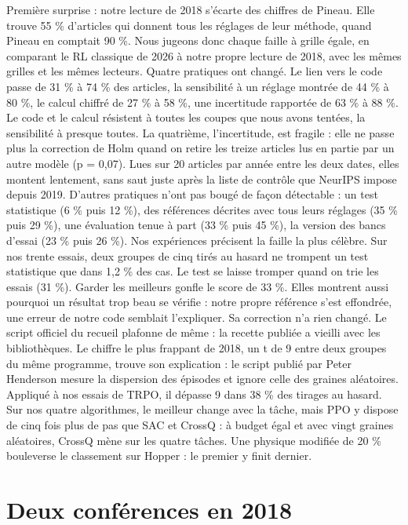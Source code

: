 \documentclass[11pt,a4paper]{article}
\begin{document}
Première surprise : notre lecture de 2018 s'écarte des chiffres de
Pineau. Elle trouve 55 \% d'articles qui donnent tous les réglages de
leur méthode, quand Pineau en comptait 90 \%. Nous jugeons donc chaque
faille à grille égale, en comparant le RL classique de 2026 à notre
propre lecture de 2018, avec les mêmes grilles et les mêmes lecteurs.
Quatre pratiques ont changé. Le lien vers le code passe de 31 \% à 74 \%
des articles, la sensibilité à un réglage montrée de 44 \% à 80 \%, le
calcul chiffré de 27 \% à 58 \%, une incertitude rapportée de 63 \% à 88
\%. Le code et le calcul résistent à toutes les coupes que nous avons
tentées, la sensibilité à presque toutes. La quatrième, l'incertitude,
est fragile : elle ne passe plus la correction de Holm quand on retire
les treize articles lus en partie par un autre modèle (p = 0,07). Lues
sur 20 articles par année entre les deux dates, elles montent lentement,
sans saut juste après la liste de contrôle que NeurIPS impose depuis
2019. D'autres pratiques n'ont pas bougé de façon détectable : un test
statistique (6 \% puis 12 \%), des références décrites avec tous leurs
réglages (35 \% puis 29 \%), une évaluation tenue à part (33 \% puis 45
\%), la version des bancs d'essai (23 \% puis 26 \%). Nos expériences
précisent la faille la plus célèbre. Sur nos trente essais, deux groupes
de cinq tirés au hasard ne trompent un test statistique que dans 1,2 \%
des cas. Le test se laisse tromper quand on trie les essais (31 \%).
Garder les meilleurs gonfle le score de 33 \%. Elles montrent aussi
pourquoi un résultat trop beau se vérifie : notre propre référence s'est
effondrée, une erreur de notre code semblait l'expliquer. Sa correction
n'a rien changé. Le script officiel du recueil plafonne de même : la
recette publiée a vieilli avec les bibliothèques. Le chiffre le plus
frappant de 2018, un t de 9 entre deux groupes du même programme, trouve
son explication : le script publié par Peter Henderson mesure la
dispersion des épisodes et ignore celle des graines aléatoires. Appliqué
à nos essais de TRPO, il dépasse 9 dans 38 \% des tirages au hasard. Sur
nos quatre algorithmes, le meilleur change avec la tâche, mais PPO y
dispose de cinq fois plus de pas que SAC et CrossQ : à budget égal et
avec vingt graines aléatoires, CrossQ mène sur les quatre tâches. Une
physique modifiée de 20 \% bouleverse le classement sur Hopper : le
premier y finit dernier.

\section{Deux conférences en 2018}\label{deux-confuxe9rences-en-2018}
\end{document}
